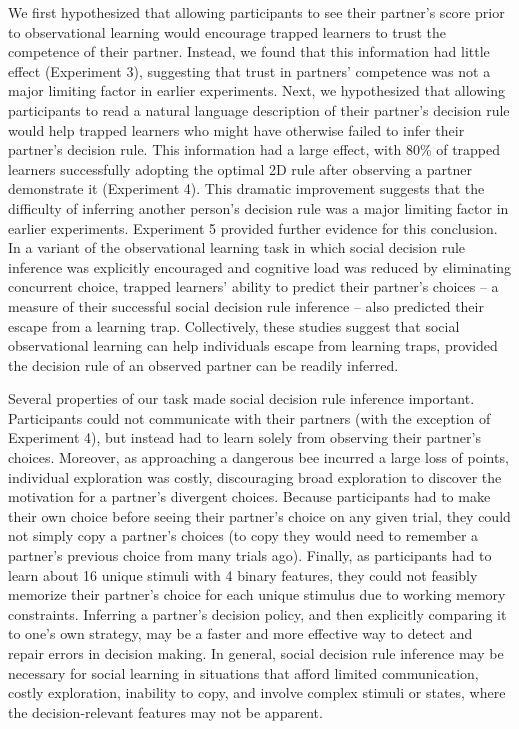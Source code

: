 \documentclass[11pt]{article} %
\begin{document}
We first hypothesized that allowing participants to see their partner's score prior to observational learning would encourage trapped learners to trust the competence of their partner. Instead, we found that this information had little effect (Experiment 3), suggesting that trust in partners' competence was not a major limiting factor in earlier experiments. Next, we hypothesized that allowing participants to read a natural language description of their partner's decision rule would help trapped learners who might have otherwise failed to infer their partner's decision rule. This information had a large effect, with 80\% of trapped learners successfully adopting the optimal 2D rule after observing a partner demonstrate it (Experiment 4). This dramatic improvement suggests that the difficulty of inferring another person's decision rule was a major limiting factor in earlier experiments. Experiment 5 provided further evidence for this conclusion. In a variant of the observational learning task in which social decision rule inference was explicitly encouraged and cognitive load was reduced by eliminating concurrent choice,  trapped learners' ability to predict their partner's choices -- a measure of their successful social decision rule inference -- also predicted their escape from a learning trap. Collectively, these studies suggest that social observational learning can help individuals escape from learning traps, provided the decision rule of an observed partner can be readily inferred. 

Several properties of our task made social decision rule inference important. Participants could not communicate with their partners (with the exception of Experiment 4), but instead had to learn solely from observing their partner's choices. Moreover, as approaching a dangerous bee incurred a large loss of points, individual exploration was costly, discouraging broad exploration to discover the motivation for a partner's divergent choices. Because participants had to make their own choice before seeing their partner's choice on any given trial, they could not simply copy a partner's choices (to copy they would need to remember a partner's previous choice from many trials ago). Finally, as participants had to learn about 16 unique stimuli with 4 binary features, they could not feasibly memorize their partner's choice for each unique stimulus due to working memory constraints. Inferring a partner's decision policy, and then explicitly comparing it to one's own strategy, may be a faster and more effective way to detect and repair errors in decision making. In general, social decision rule inference may be necessary for social learning in situations that afford limited communication, costly exploration, inability to copy, and involve complex stimuli or states, where the decision-relevant features may not be apparent. 
\end{document}

